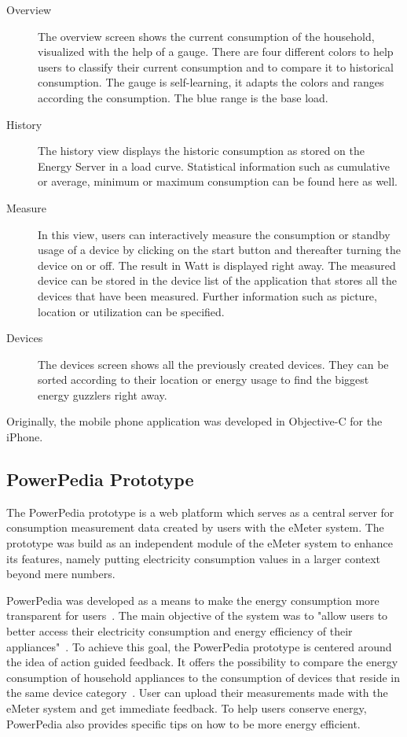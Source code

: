 \begin{description}
 \item[Overview] The overview screen shows the current consumption of the household, visualized with the help of a gauge. There are four different colors to help users to classify their current consumption and to compare it to historical consumption. The gauge is self-learning, it adapts the colors and ranges according the consumption. The blue range is the base load.
 \item[History] The history view displays the historic consumption as stored on the Energy Server in a load curve. Statistical information such as cumulative or average, minimum or maximum consumption can be found here as well.
 \item[Measure] In this view, users can interactively measure the consumption or standby usage of a device by clicking on the start button and thereafter turning the device on or off. The result in Watt is displayed right away. The measured device can be stored in the device list of the application that stores all the devices that have been measured. Further information such as picture, location or utilization can be specified.
 \item[Devices] The devices screen shows all the previously created devices. They can be sorted according to their location or energy usage to find the biggest energy guzzlers right away.   
\end{description}
Originally, the mobile phone application was developed in Objective-C for the iPhone.

\subsection{PowerPedia Prototype}
The PowerPedia prototype is a web platform which serves as a central server for consumption measurement data created by users with the eMeter system. The prototype was build as an independent module of the eMeter system to enhance its features, namely putting electricity consumption values in a larger context beyond mere numbers.

PowerPedia was developed as a means to make the energy consumption more transparent for users~\cite{merklepp}. The main objective of the system was to "allow users to better access their electricity consumption and energy efficiency of their appliances"~\cite{weiss:inprocPUC:2012}. To achieve this goal, the PowerPedia prototype is centered around the idea of action guided feedback. It offers the possibility to compare the energy consumption of household appliances to the consumption of devices that reside in the same device category~\cite{merklepp}. User can upload their measurements made with the eMeter system and get immediate feedback. To help users conserve energy, PowerPedia also provides specific tips on how to be more energy efficient.

